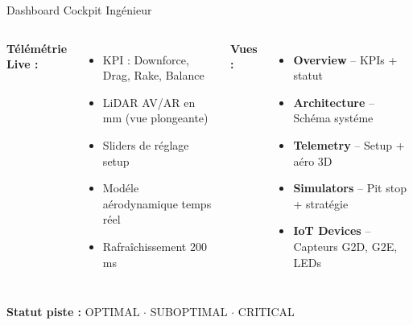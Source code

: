 \documentclass[11pt,aspectratio=169]{beamer}
\begin{document}
\begin{frame}{Dashboard Cockpit Ing\'enieur}
  \begin{columns}
    \textbf{\textcolor{ferrariRed}{T\'el\'em\'etrie Live :}} \\[0.2cm]
    \begin{itemize}
      \item KPI : Downforce, Drag, Rake, Balance
      \item LiDAR AV/AR en mm (vue plongeante)
      \item Sliders de r\'eglage setup
      \item Mod\'ele a\'erodynamique temps r\'eel
      \item Rafra\^ichissement 200 ms
    \end{itemize}

    \textbf{\textcolor{ferrariRed}{Vues :}} \\[0.2cm]
    \begin{itemize}
      \item \textbf{Overview} -- KPIs + statut
      \item \textbf{Architecture} -- Sch\'ema syst\'eme
      \item \textbf{Telemetry} -- Setup + a\'ero 3D
      \item \textbf{Simulators} -- Pit stop + strat\'egie
      \item \textbf{IoT Devices} -- Capteurs G2D, G2E, LEDs
    \end{itemize}
  \end{columns}

  \vspace{0.3cm}
  \begin{center}
    \textcolor{ferrariGreen}{\textbf{Statut piste :} OPTIMAL $\cdot$ SUBOPTIMAL $\cdot$ CRITICAL}
  \end{center}
\end{frame}
\end{document}
